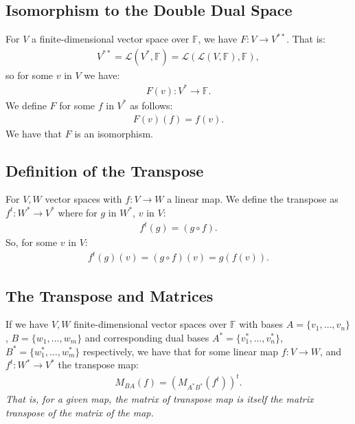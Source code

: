 \documentclass[a4paper, 12pt, twoside]{article}
\begin{document}
\subsection{Isomorphism to the Double Dual Space}

For $V$ a finite-dimensional vector space over $\mathbb{F}$, 
we have $F: V \to V^{**}$. That is: \begin{gather*}
  V^{**} = \mathcal{L}(V^*, \mathbb{F}) = \mathcal{L}(\mathcal{L}(V, \mathbb{F}), \mathbb{F}),
\end{gather*} so for some $v$ in $V$ we have: 
\begin{gather*}
  F(v) : V^* \to \mathbb{F}.
\end{gather*} We define $F$ for some $f$ in $V^*$ as follows: 
\begin{gather*}
  F(v)(f) = f(v).
\end{gather*} We have that $F$ is an isomorphism.

\subsection{Definition of the Transpose}

For $V, W$ vector spaces with $f : V \to W$ a linear map. We define
the transpose as $f^t : W^* \to V^*$ where for $g$ in $W^*$, $v$ in
$V$: \begin{gather*}
  f^t(g) = (g \circ f).
\end{gather*} So, for some $v$ in $V$: \begin{gather*}
  f^t(g)(v) = (g \circ f)(v) = g(f(v)).
\end{gather*}

\subsection{The Transpose and Matrices}

If we have $V, W$ finite-dimensional vector spaces over $\mathbb{F}$ with bases 
$A = \{v_1, \ldots, v_n\}$, $B = \{w_1, \ldots, w_m\}$ and corresponding
dual bases $A^* = \{v_1^*, \ldots, v_n^*\}$, $B^* = \{w_1^*, \ldots, w_m^*\}$
respectively, we have that for some linear map $f : V \to W$, and
$f^t : W^* \to V^*$ the transpose map: \begin{gather*}
  M_{BA}(f) = \left( M_{A^*B^*}(f^t) \right)^t.
\end{gather*} \textit{That is, for a given map, the matrix of 
transpose map is itself the matrix transpose of the matrix of the map.}
\end{document}
